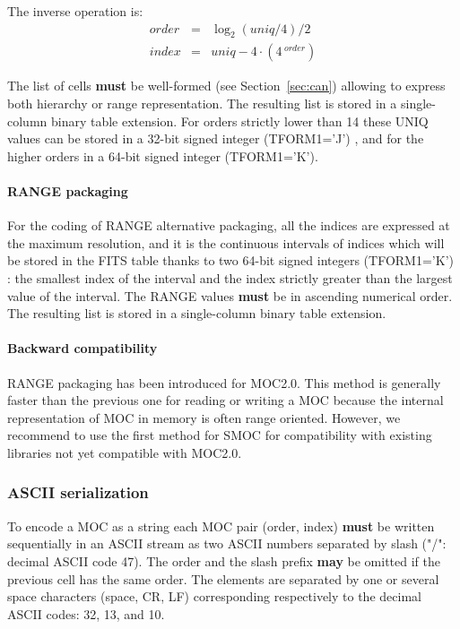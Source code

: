 \documentclass[11pt,a4paper]{ivoa}
\begin{document}
\par\noindent
The inverse operation is:
\begin{eqnarray*}
    \textit{order} & = &\log_2(\textit{uniq}/4)/2\\
    \textit{index} & = &\textit{uniq} - 4 \cdot (4\,^\textit{order})
\end{eqnarray*}

\par\noindent The list of cells {\bf must} be well-formed
(see Section~\ref{sec:can}) allowing
to express both hierarchy or range representation. The resulting
list is stored in a single-column binary table extension.
For orders strictly lower than 14 these UNIQ values can be stored
in a 32-bit signed integer (TFORM1='J') , and for the higher
orders in a 64-bit signed integer (TFORM1='K').

\paragraph{RANGE packaging}
For the coding of RANGE alternative packaging, all the indices are
expressed at the maximum resolution, and it is the continuous
intervals of indices which will be stored
in the FITS table thanks to two 64-bit signed integers (TFORM1='K') :
the smallest index of the interval and the index strictly greater
than the largest value of the interval. The RANGE values {\bf must}
be in ascending numerical order. The resulting list is stored in a
single-column binary table extension. 


\paragraph{Backward compatibility}
RANGE packaging has been introduced for MOC2.0.
This method is generally faster than the previous one for reading or
writing a MOC because the internal representation of MOC
in memory is often range oriented. However, we recommend to
use the first method for SMOC for compatibility with existing libraries 
not yet compatible with MOC2.0.

\subsubsection{ASCII serialization}
To encode a MOC as a string each MOC pair (order, index) {\bf must} be written
sequentially in an ASCII stream as two ASCII numbers separated
by slash ("/": decimal ASCII code 47). The order and the slash prefix
{\bf may} be omitted if the previous cell has the same order. The
elements are separated by one or several space characters (space, CR,
LF) corresponding respectively to the decimal ASCII codes: 32, 13, and
10.
\end{document}
